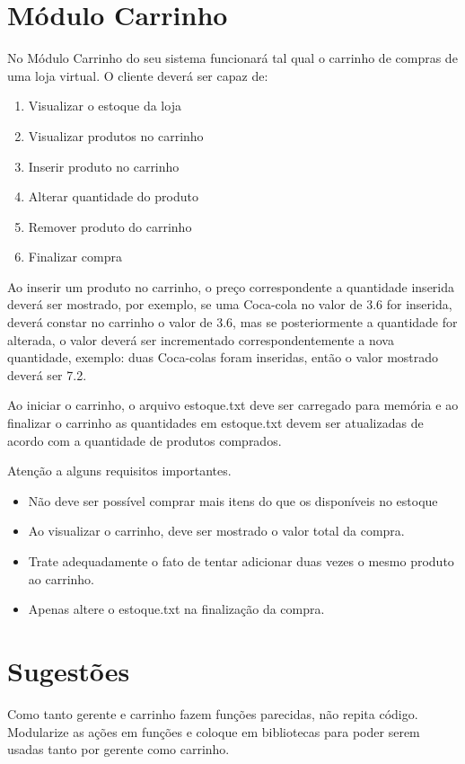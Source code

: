 \documentclass[12pt]{article}
\begin{document}
\section{Módulo Carrinho}
No Módulo Carrinho do seu sistema funcionará tal qual o carrinho de compras de uma loja virtual. O cliente deverá ser capaz de:

\begin{enumerate}
  \item Visualizar o estoque da loja
  \item Visualizar produtos no carrinho
  \item Inserir produto no carrinho
  \item Alterar quantidade do produto
  \item Remover produto do carrinho
  \item Finalizar compra
\end{enumerate}

Ao inserir um produto no carrinho, o preço correspondente a quantidade inserida deverá ser mostrado, por exemplo, se uma Coca-cola no valor de 3.6 for inserida, deverá constar no carrinho o valor de 3.6, mas se posteriormente a quantidade for alterada, o valor deverá ser incrementado correspondentemente a nova quantidade, exemplo: duas Coca-colas foram inseridas, então o valor mostrado deverá ser 7.2.

Ao iniciar o carrinho, o arquivo estoque.txt deve ser carregado para memória e ao finalizar o carrinho as quantidades em estoque.txt devem ser atualizadas de acordo com a quantidade de produtos comprados.

Atenção a alguns requisitos importantes.
\begin{itemize}
\item Não deve ser possível comprar mais itens do que os disponíveis no estoque
\item Ao visualizar o carrinho, deve ser mostrado o valor total da compra.
\item Trate adequadamente o fato de tentar adicionar duas vezes o mesmo produto ao carrinho.
\item Apenas altere o estoque.txt na finalização da compra.
\end{itemize}

\section{Sugestões}

Como tanto gerente e carrinho fazem funções parecidas, não repita código. Modularize as ações em funções e coloque em bibliotecas para poder serem usadas tanto por gerente como carrinho. 
\end{document}
